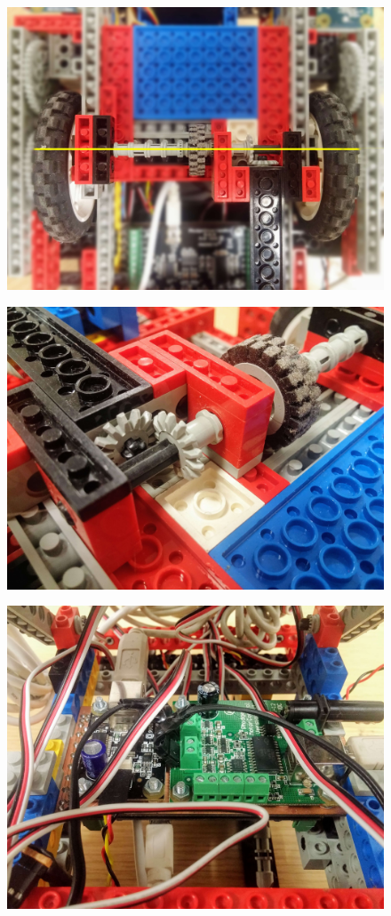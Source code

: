 \begin{figure}[ht]
    \centering
    \includegraphics[width=0.7\linewidth]{res/robot-pics/pivot-wheel-layout.jpg}
    \caption{}
    \label{fig:}
\end{figure}

\begin{figure}[ht]
    \centering
    \includegraphics[width=0.7\linewidth]{res/robot-pics/pivot-wheel-axel-transfer.jpg}
    \caption{}
    \label{fig:}
\end{figure}

\begin{figure}[ht]
    \centering
    \includegraphics[width=0.7\linewidth]{res/robot-pics/phidget-boards.jpg}
    \caption{}
    \label{fig:}
\end{figure}

